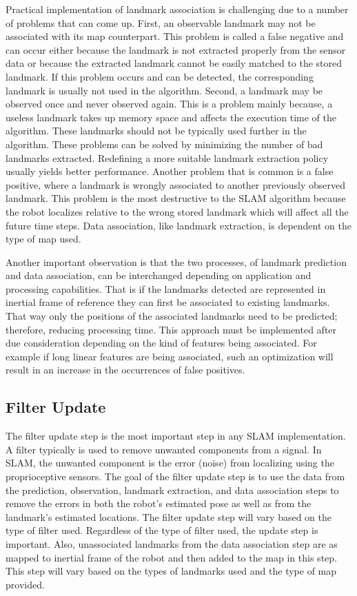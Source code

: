 Practical implementation of landmark association is challenging due to a number of problems that can come up. First, an observable landmark may not be associated with its map counterpart. This problem is called a false negative and can occur either because the landmark is not extracted properly from the sensor data or because the extracted landmark cannot be easily matched to the stored landmark. If this problem occurs and can be detected, the corresponding landmark is usually not used in the algorithm. Second, a landmark may be observed once and never observed again. This is a problem mainly because, a useless landmark takes up memory space and affects the execution time of the algorithm. These landmarks should not be typically used further in the algorithm. These problems can be solved by minimizing the number of bad landmarks extracted. Redefining a more suitable landmark extraction policy usually yields better performance. Another problem that is common is a false positive, where a landmark is wrongly associated to another previously observed landmark. This problem is the most destructive to the SLAM algorithm because the robot localizes relative to the wrong stored landmark which will affect all the future time steps. Data association, like landmark extraction, is dependent on the type of map used.

Another important observation is that the two processes, of landmark prediction and data association, can be interchanged depending on application and processing capabilities. That is if the landmarks detected are represented in inertial frame of reference they can first be associated to existing landmarks. That way only the positions of the associated landmarks need to be predicted; therefore, reducing processing time. This approach must be implemented after due consideration depending on the kind of features being associated. For example if long linear features are being associated, such an  optimization will result in an increase in the occurrences of false positives.

\subsection{Filter Update}

The filter update step is the most important step in any SLAM implementation. A filter typically is used to remove unwanted components from a signal. In SLAM, the unwanted component is the error (noise) from localizing using the proprioceptive sensors. The goal of the filter update step is to use the data from the prediction, observation, landmark extraction, and data association steps to remove the errors in both the robot's estimated pose as well as from the landmark's estimated locations. The filter update step will vary based on the type of filter used. Regardless of the type of filter used, the update step is important. Also, unassociated landmarks from the data association step are as mapped to inertial frame of the robot and then added to the map in this step. This step will vary based on the types of landmarks used and the type of map provided. 

